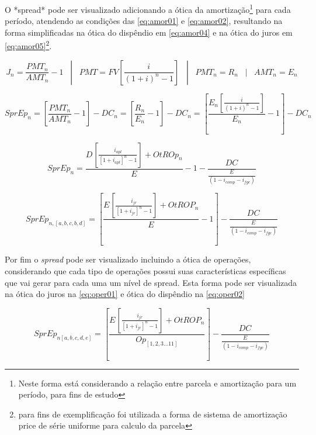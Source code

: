 \documentclass[
  12pt,
  12pt,
  openright,
  oneside,
  a4paper,
  chapter=TITLE,
  section=TITLE,
  subsection=TITLE,
  subsubsection=TITLE,
  english,
  portugues,
  sumario=tradicional]{abntex2}
\begin{document}
\begin{apendicesenv}
O *spread* pode ser visualizado adicionando a ótica da amortização\footnote{Neste forma está considerando a relação entre parcela e amortização para um período, para fins de estudo} para cada período, atendendo as condições das \autoref{eq:amor01} e \autoref{eq:amor02}, resultando na forma simplificadas na ótica do dispêndio em \autoref{eq:amor04} e na ótica do juros em \autoref{eq:amor05}\footnote{para fins de exemplificação foi utilizada a forma de sistema de amortização price de série uniforme para calculo da parcela}.


\begin{equation}\label{eq:amor01}
J_{n} = \frac{PMT_{n}}{AMT_{n}} - 1 \hspace{10pt} | \hspace{10pt} PMT = FV[\frac{i}{(1 + i)^n - 1}]  \hspace{10pt} | \hspace{10pt} PMT_{n} = R_{n} \hspace{10pt} | \hspace{10pt} AMT_{n} = E_{n}
\end{equation}



\begin{equation}\label{eq:amor02}
SprEp_{n} = [\frac{PMT_{n}}{AMT_{n}} -1] - DC_{n} = [\frac{R_{n}}{E_{n}} -1] - DC_{n} = [\frac{E_{n}[\frac{i}{(1 + i)^n - 1}]}{E_{n}} -1] - DC_{n}
\end{equation}



\begin{equation}\label{eq:amor04}
SprEp_{n} = \frac{D_{}[\frac{   i_{apl}  }{  [1 + i_{apl}]^n -1  }] + OtROp_{n}}{E_{}} -1 - \frac{DC_{}}{\frac{E_{}}{(1 - i_{comp} - i_{fgc})}}
\end{equation}


\begin{equation}\label{eq:amor05}
SprEp_{n,[a,b,c,b,d]} =  [\frac{E_{}[\frac{   i_{jr}  }{  [1 + i_{jr}]^n -1  }] + OtROP_{n}}{E_{}} -1] - \frac{DC_{}}{\frac{E_{}}{(1 - i_{comp} - i_{fgc})}}
\end{equation}


Por fim o \emph{spread} pode ser visualizado incluindo a ótica de operações, considerando que cada tipo de operações possui suas características específicas que vai gerar para cada uma um nível de spread. Esta forma pode ser visualizada na ótica do juros na \autoref{eq:oper01} e ótica do dispêndio na \autoref{eq:oper02}  


\begin{equation}\label{eq:oper01}
SprEp_{n[a,b,c,d,e]} =  [\frac{E_{}[\frac{   i_{jr}  }{  [1 + i_{jr}]^n -1  }] + OtROP_{n}}{Op_{[1,2,3...11]}}] - \frac{DC_{}}{\frac{E_{}}{(1 - i_{comp} - i_{fgc})}}
\end{equation}





\end{apendicesenv}
\end{document}
